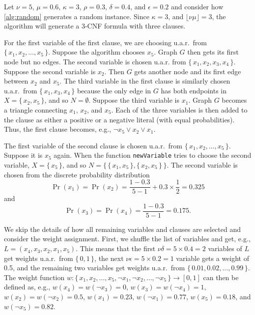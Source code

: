 \begin{example}\label{example:algorithm}
  Let $\nu = 5$, $\mu = 0.6$, $\kappa = 3$, $\rho = 0.3$, $\delta = 0.4$,
  and $\epsilon = 0.2$ and consider how \cref{alg:random} generates a random
  instance. Since $\kappa = 3$, and $\lfloor\nu\mu\rfloor = 3$,
  the algorithm will generate a 3-CNF formula with three clauses.

  For the first variable of the first clause, we are choosing u.a.r.\ from $\{\,
  x_1, x_2, \dots, x_5 \,\}$. Suppose the algorithm chooses $x_5$. Graph $G$
  then gets its first node but no edges. The second variable is chosen u.a.r.
  from $\{\, x_1, x_2, x_3, x_4 \,\}$. Suppose the second variable is $x_2$.
  Then $G$ gets another node and its first edge between $x_2$ and $x_5$. The
  third variable in the first clause is similarly chosen u.a.r.\ from $\{\, x_1,
  x_3, x_4 \,\}$ because the only edge in $G$ has both endpoints in $X = \{\,
  x_2, x_5 \,\}$, and so $N = \emptyset$. Suppose the third variable is $x_1$.
  Graph $G$ becomes a triangle connecting $x_1$, $x_2$, and $x_5$. Each of
  the three variables is then added to the clause as either a positive or a
  negative literal (with equal probabilities). Thus, the first clause becomes,
  e.g., $\neg x_5 \lor x_2 \lor x_1$.

  The first variable of the second clause is chosen u.a.r.\ from $\{\, x_1, x_2,
  \dots, x_5\,\}$. Suppose it is $x_5$ again. When the function
  \texttt{newVariable} tries to choose the second variable, $X = \{\, x_5 \,\}$,
  and so $N = \{\, \{\, x_1, x_5 \,\}, \{\, x_2, x_5 \,\}\,\}$. The second
  variable is chosen from the discrete probability distribution
  \[
    \Pr(x_1) = \Pr(x_2) = \frac{1 - 0.3}{5 - 1} + 0.3 \times \frac{1}{2} = 0.325
  \]
  and
  \[
    \Pr(x_3) = \Pr(x_4) = \frac{1 - 0.3}{5 - 1} = 0.175.
  \]

  We skip the details of how all remaining variables and clauses are selected
  and consider the weight assignment. First, we shuffle the list of variables
  and get, e.g., $L = (x_4, x_3, x_2, x_1, x_5)$. This means that the first
  $\nu\delta = 5 \times 0.4 = 2$ variables of $L$ get weights u.a.r.\ from $\{\,
  0, 1 \,\}$, the next $\nu\epsilon = 5 \times 0.2 = 1$ variable gets a weight
  of 0.5, and the remaining two variables get weights u.a.r.\ from $\{\,0.01,
  0.02, \dots, 0.99 \,\}$. The weight function $w\colon \{\, x_1, x_2, \dots,
  x_5, \neg x_1, \neg x_2, \dots, \neg x_5\,\} \to [0, 1]$ can then be defined
  as, e.g., $w(x_4) = w(\neg x_3) = 0$, $w(x_3) = w(\neg x_4) = 1$, $w(x_2) =
  w(\neg x_2) = 0.5$, $w(x_1) = 0.23$, $w(\neg x_1) = 0.77$, $w(x_5) = 0.18$,
  and $w(\neg x_5) = 0.82$.
\end{example}

